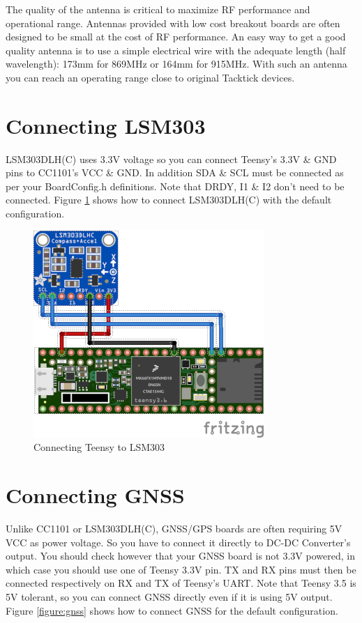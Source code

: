 \documentclass{report}
\begin{document}
The quality of the antenna is critical to maximize RF performance and operational range. Antennas provided with low cost breakout boards are often designed to be small at the cost of RF performance. An easy way to get a good quality antenna is to use a simple electrical wire with the adequate length (half wavelength): 173mm for 869MHz or 164mm for 915MHz. With such an antenna you can reach an operating range close to original Tacktick devices.

\section{Connecting LSM303}

LSM303DLH(C) uses 3.3V voltage so you can connect Teensy's 3.3V \& GND pins to CC1101's VCC \& GND. In addition SDA \& SCL must be connected as per your BoardConfig.h definitions. Note that DRDY, I1 \& I2 don't need to be connected. Figure \ref{figure:lsm303} shows how to connect LSM303DLH(C) with the default configuration.

\begin{figure}[h]
	\centering
	\includegraphics{MicronetToNMEA_LSM303.png}
	\caption{Connecting Teensy to LSM303}
	\label{figure:lsm303}
\end{figure}

\section{Connecting GNSS}

Unlike CC1101 or LSM303DLH(C), GNSS/GPS boards are often requiring 5V VCC as power voltage. So you have to connect it directly to DC-DC Converter's output. You should check however that your GNSS board is not 3.3V powered, in which case you should use one of Teensy 3.3V pin.
TX and RX pins must then be connected respectively on RX and TX of Teensy's UART. Note that Teensy 3.5 is 5V tolerant, so you can connect GNSS directly even if it is using 5V output. Figure \ref{figure:gnss} shows how to connect GNSS for the default configuration.
\end{document}
